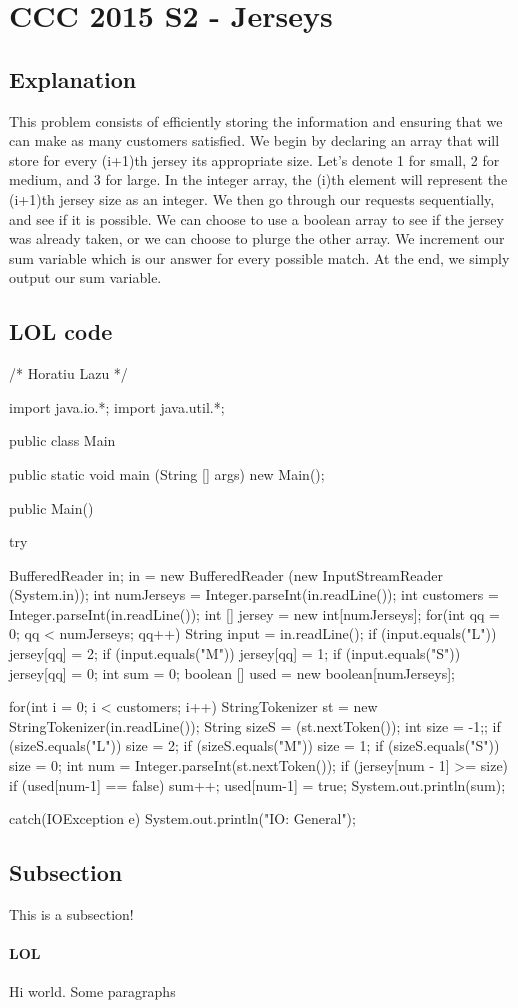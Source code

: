 \documentclass[52pt]{article}
\begin{document}
	\section {CCC 2015 S2 - Jerseys}
	\subsection {Explanation}
	This problem consists of efficiently storing the information and ensuring that we can make as many customers satisfied. We begin by declaring an array that will store for every (i+1)th jersey its appropriate size. Let's denote 1 for small, 2 for medium, and 3 for large. In the integer array, the (i)th element will represent the (i+1)th jersey size as an integer. We then go through our requests sequentially, and see if it is possible. We can choose to use a boolean array to see if the jersey was already taken, or we can choose to plurge the other array. We increment our sum variable which is our answer for every possible match. At the end, we simply output our sum variable.
	
	\subsection {LOL code}
	/* Horatiu Lazu */

	import java.io.*;
	import java.util.*;

	public class Main{
		public static void main (String [] args){
			new Main();
		}
		
		public Main(){
			try{
				BufferedReader in;
				in = new BufferedReader (new InputStreamReader (System.in));
				int numJerseys  = Integer.parseInt(in.readLine());
				int customers = Integer.parseInt(in.readLine());
				int [] jersey = new int[numJerseys];
				for(int qq = 0; qq < numJerseys; qq++){
					String input = in.readLine();
					if (input.equals("L")){
						jersey[qq] = 2;
					}
					if (input.equals("M")){
						jersey[qq] = 1;
					}
					if (input.equals("S")){
						jersey[qq] = 0;
					}
				}
				int sum = 0;
				boolean [] used = new boolean[numJerseys];
				
				for(int i = 0; i < customers; i++){
					StringTokenizer st =  new StringTokenizer(in.readLine());
					String sizeS = (st.nextToken());
					int size = -1;;
					if (sizeS.equals("L")){
						size = 2;
					}
					if (sizeS.equals("M")){
						size = 1;
					}
					if (sizeS.equals("S")){
						size = 0;
					}
					int num = Integer.parseInt(st.nextToken());
					if (jersey[num - 1] >= size){
						if (used[num-1] == false){
							sum++;
							used[num-1] = true;
						}
					}                          
				}
				System.out.println(sum);
			}
			catch(IOException e){
				System.out.println("IO: General");
			}
		}
	}
	\subsection{Subsection} %
	This is a subsection!
	
	\paragraph{LOL}
	Hi world. Some paragraphs
\end{document}
